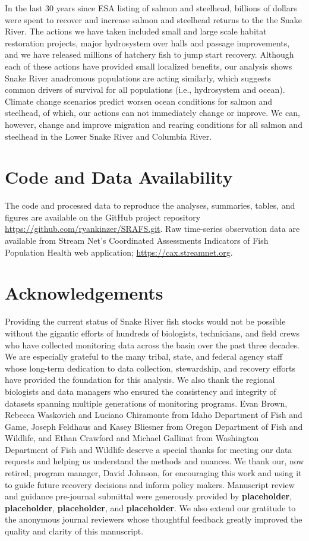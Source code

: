 \documentclass[10pt,a4paper]{article}
\begin{document}
In the last 30 years since ESA listing of salmon and steelhead, billions of dollars were spent to recover and increase salmon and steelhead returns to the the Snake River. The actions we have taken included small and large scale habitat restoration projects, major hydrosystem over halls and passage improvements, and we have released millions of hatchery fish to jump start recovery. Although each of these actions have provided small localized benefits, our analysis shows Snake River anadromous populations are acting similarly, which suggests common drivers of survival for all populations (i.e., hydrosystem and ocean). Climate change scenarios predict worsen ocean conditions for salmon and steelhead, of which, our actions can not immediately change or improve. We can, however, change and improve migration and rearing conditions for all salmon and steelhead in the Lower Snake River and Columbia River.

\section{Code and Data Availability}\label{code-and-data-availability}

The code and processed data to reproduce the analyses, summaries, tables, and figures are available on the GitHub project repository \url{https://github.com/ryankinzer/SRAFS.git}. Raw time-series observation data are available from Stream Net's Coordinated Assessments Indicators of Fish Population Health web application; \url{https://cax.streamnet.org}.

\section{Acknowledgements}\label{acknowledgements}

Providing the current status of Snake River fish stocks would not be possible without the gigantic efforts of hundreds of biologists, technicians, and field crews who have collected monitoring data across the basin over the past three decades. We are especially grateful to the many tribal, state, and federal agency staff whose long-term dedication to data collection, stewardship, and recovery efforts have provided the foundation for this analysis. We also thank the regional biologists and data managers who ensured the consistency and integrity of datasets spanning multiple generations of monitoring programs. Evan Brown, Rebecca Waskovich and Luciano Chiramonte from Idaho Department of Fish and Game, Joseph Feldhaus and Kasey Bliesner from Oregon Department of Fish and Wildlife, and Ethan Crawford and Michael Gallinat from Washington Department of Fish and Wildlife deserve a special thanks for meeting our data requests and helping us understand the methods and nuances. We thank our, now retired, program manager, David Johnson, for encouraging this work and using it to guide future recovery decisions and inform policy makers. Manuscript review and guidance pre-journal submittal were generously provided by \textbf{placeholder}, \textbf{placeholder}, \textbf{placeholder}, and \textbf{placeholder}. We also extend our gratitude to the anonymous journal reviewers whose thoughtful feedback greatly improved the quality and clarity of this manuscript.
\end{document}
